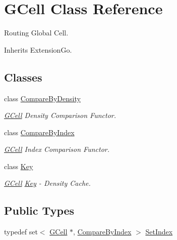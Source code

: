 \hypertarget{classKatabatic_1_1GCell}{}\section{G\+Cell Class Reference}
\label{classKatabatic_1_1GCell}


Routing Global Cell.  




Inherits Extension\+Go.

\subsection*{Classes}
\begin{DoxyCompactItemize}
\item 
class \hyperlink{classKatabatic_1_1GCell_1_1CompareByDensity}{Compare\+By\+Density}
\begin{DoxyCompactList}\small\item\em \hyperlink{classKatabatic_1_1GCell}{G\+Cell} Density Comparison Functor. \end{DoxyCompactList}\item 
class \hyperlink{classKatabatic_1_1GCell_1_1CompareByIndex}{Compare\+By\+Index}
\begin{DoxyCompactList}\small\item\em \hyperlink{classKatabatic_1_1GCell}{G\+Cell} Index Comparison Functor. \end{DoxyCompactList}\item 
class \hyperlink{classKatabatic_1_1GCell_1_1Key}{Key}
\begin{DoxyCompactList}\small\item\em \hyperlink{classKatabatic_1_1GCell}{G\+Cell} \hyperlink{classKatabatic_1_1GCell_1_1Key}{Key} -\/ Density Cache. \end{DoxyCompactList}\end{DoxyCompactItemize}
\subsection*{Public Types}
\begin{DoxyCompactItemize}
\item 
typedef set$<$ \hyperlink{classKatabatic_1_1GCell}{G\+Cell} $\ast$, \hyperlink{classKatabatic_1_1GCell_1_1CompareByIndex}{Compare\+By\+Index} $>$ \hyperlink{classKatabatic_1_1GCell_aacb1c215b203bfba5729f135b3221d40}{Set\+Index}
\end{DoxyCompactItemize}
